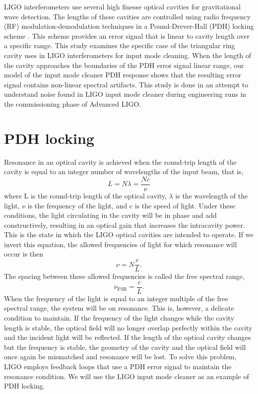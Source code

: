 LIGO interferometers use several high finesse optical cavities for gravitational wave 
detection. The lengths of these cavities are controlled using radio frequency 
(RF) modulation-demodulation techniques in a Pound-Drever-Hall (PDH) locking scheme 
\cite{Black01}.  
This scheme provides an error signal that is linear to cavity length over a 
specific range. This study examines the specific case of the triangular ring cavity 
uses in LIGO interferometers for input mode cleaning. When the length of the cavity 
approaches the boundaries of the PDH error signal linear range, our model of the 
input mode cleaner PDH response shows that the resulting error signal contains 
non-linear spectral artifacts. This study is done in an attempt to understand noise 
found in LIGO input mode cleaner during engineering runs in the commissioning phase 
of Advanced LIGO. 

\section{PDH locking}

Resonance in an optical cavity is achieved when the round-trip length of the 
cavity is equal to an integer number of wavelengths of the input beam, that is, 
\begin{equation}
L = N\lambda = \frac{Nc}{\nu}
\end{equation}
where L is the round-trip length of the optical cavity, $\lambda$ is the 
wavelength of the light, $\nu$ is the frequency of the light, and c is the 
speed of light. 
Under these conditions, the light circulating in the cavity
will be in phase and add constructively, resulting in an optical gain that
increases the intracavity power. This is the state in which the LIGO 
optical cavities are intended to operate.
If we invert this equation, the allowed 
frequencies of light for which resonance will occur is then 
\begin{equation}
\nu = N\frac{c}{L}.
\end{equation}
The spacing between these allowed frequencies is called the free spectral 
range, 
\begin{equation}
\nu_\mathrm{FSR} = \frac{c}{L}.
\end{equation}
When the frequency of the light is equal to an integer multiple of 
the free spectral range, the system will be on resonance. This is, 
however, a delicate condition to maintain. If the frequency of the light 
changes while the cavity length is stable, the optical field will no longer 
overlap perfectly within the cavity 
and the incident light will be reflected. If the length of the optical cavity 
changes but the frequency is stable, the geometry of the cavity and the optical 
field will once again be mismatched and resonance will be lost. 
To solve this problem, LIGO 
employs feedback loops that use a PDH error signal to maintain the resonance 
condition. We will use the LIGO input mode cleaner as an example of PDH locking.

